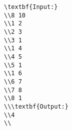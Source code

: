 \begin{verbatim}
\textbf{Input:}
\\8 10
\\1 2
\\2 3
\\3 1
\\1 4
\\4 5
\\5 1
\\1 6
\\6 7
\\7 8
\\8 1
\\\textbf{Output:}
\\4
\\\end{verbatim}